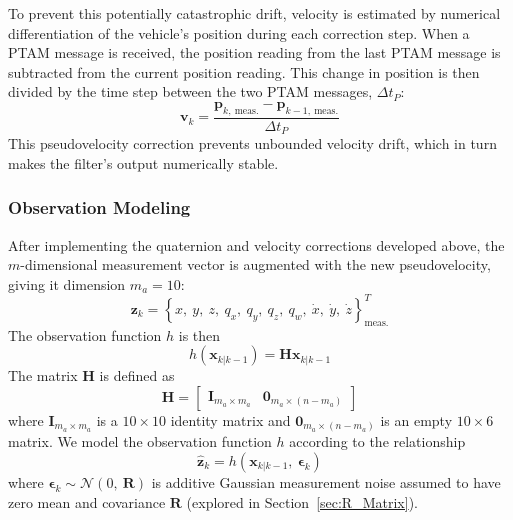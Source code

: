 To prevent this potentially catastrophic drift, velocity is estimated by numerical differentiation of the vehicle's position during each correction step. When a PTAM message is received, the position reading from the last PTAM message is subtracted from the current position reading. This change in position is then divided by the time step between the two PTAM messages, $\Delta t_{P}$:
%
\begin{equation}
\mathbf{v}_{k} = \frac{\mathbf{p}_{k,\ \text{meas.}} - \mathbf{p}_{k-1,\ \text{meas.}}}{\Delta t_{P}}
\end{equation}
%
This pseudovelocity correction prevents unbounded velocity drift, which in turn makes the filter's output numerically stable.

\subsubsection{Observation Modeling}

After implementing the quaternion and velocity corrections developed above, the $m$-dimensional measurement vector is augmented with the new pseudovelocity, giving it dimension $m_{a} = 10$:
%
\begin{equation}
\mathbf{z}_{k} = \left\lbrace x,\ y,\ z,\ q_{x},\ q_{y},\ q_{z},\ q_{w},\ \dot{x},\ \dot{y},\ \dot{z} \right\rbrace ^{T} _{\text{meas.}} 
\end{equation}
%
The observation function $h$ is then
%
\begin{equation}
h \left( \mathbf{x}_{k | k-1} \right) = \mathbf{H} \mathbf{x}_{k | k-1}
\end{equation}
%
The matrix $\mathbf{H}$ is defined as
%
\begin{equation}
\mathbf{H} = 
\begin{bmatrix}
\mathbf{I}_{m_{a} \times m_{a}} & \mathbf{0}_{m_{a} \times \left(n-m_{a}\right)}
\end{bmatrix}
\end{equation}
%
where $\mathbf{I}_{m_{a} \times m_{a}}$ is a $10 \times 10$ identity matrix and $\mathbf{0}_{m_{a} \times \left(n-m_{a}\right)}$ is an empty $10 \times 6$ matrix. We model the observation function $h$ according to the relationship
%
\begin{equation}
\hat{\mathbf{z}}_{k} = h \left( \mathbf{x}_{k | k-1},\ \bm{\epsilon}_{k} \right)
\end{equation}
%
where $\bm{\epsilon}_{k} \sim \mathcal{N} \left( 0,\ \mathbf{R} \right)$ is additive Gaussian measurement noise assumed to have zero mean and covariance $\mathbf{R}$ (explored in Section~\ref{sec:R_Matrix}).

